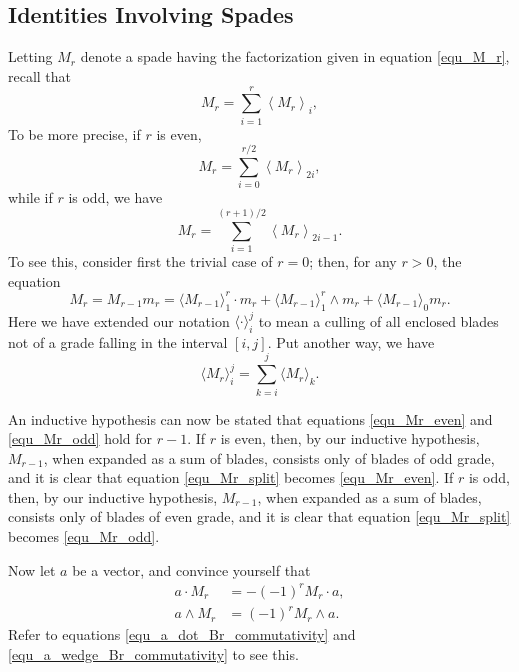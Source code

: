 \documentclass{birkjour}
\theoremstyle{definition}
\theoremstyle{remark}
\numberwithin{equation}{section}
\begin{document}
\subsection{Identities Involving Spades}

Letting $M_r$ denote a spade having the factorization given in equation \eqref{equ_M_r}, recall that
\begin{equation*}
M_r = \sum_{i=1}^r\left\langle M_r\right\rangle_i,
\end{equation*}
To be more precise, if $r$ is even,
\begin{equation}\label{equ_Mr_even}
M_r = \sum_{i=0}^{r/2}\left\langle M_r\right\rangle_{2i},
\end{equation}
while if $r$ is odd, we have
\begin{equation}\label{equ_Mr_odd}
M_r = \sum_{i=1}^{(r+1)/2}\left\langle M_r\right\rangle_{2i-1}.
\end{equation}
To see this, consider first the trivial case of $r=0$; then, for any $r>0$, the equation
\begin{equation}\label{equ_Mr_split}
M_r = M_{r-1}m_r = \langle M_{r-1}\rangle_1^r\cdot m_r + \langle M_{r-1}\rangle_1^r\wedge m_r + \langle M_{r-1}\rangle_0 m_r.
\end{equation}
Here we have extended our notation $\langle\cdot\rangle_i^j$ to mean a culling of all enclosed blades not of a grade falling
in the interval $[i,j]$.  Put another way, we have
\begin{equation*}
\langle M_r\rangle_i^j = \sum_{k=i}^j\langle M_r\rangle_k.
\end{equation*}

An inductive hypothesis can now be stated that equations \eqref{equ_Mr_even} and \eqref{equ_Mr_odd} hold for $r-1$.
If $r$ is even, then, by our inductive hypothesis, $M_{r-1}$, when expanded as a sum of blades, consists only of blades of odd grade,
and it is clear that equation \eqref{equ_Mr_split} becomes \eqref{equ_Mr_even}.  If $r$ is odd, then, by our inductive hypothesis, $M_{r-1}$, when expanded as
a sum of blades, consists only of blades of even grade, and it is clear that equation \eqref{equ_Mr_split} becomes \eqref{equ_Mr_odd}.

Now let $a$ be a vector, and convince yourself that
\begin{align}
a\cdot M_r &= -(-1)^r M_r\cdot a,\label{equ_a_dot_Mr_commutativity} \\
a\wedge M_r &= (-1)^r M_r\wedge a.\label{equ_a_wedge_Mr_commutativity}
\end{align}
Refer to equations \eqref{equ_a_dot_Br_commutativity} and \eqref{equ_a_wedge_Br_commutativity} to see this.
\end{document}
